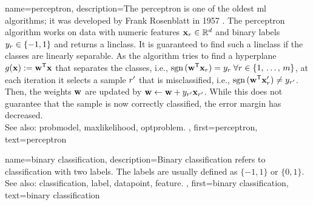 {name={perceptron}, 
	description={The perceptron is one of the oldest \gls{ml} \glspl{algorithm}; 
		it was developed by Frank Rosenblatt in 1957 \cite{rosenblatt1958perceptron}. 
		The perceptron \gls{algorithm} works on \gls{data} with numeric \glspl{feature} 
		${\bf x}_r \in \mathbb{R}^{d}$ 
		and binary \glspl{label} $y_r \in \{-1, 1\}$ and returns a \gls{linclass}. %
		It is guaranteed to find such a \gls{linclass} if the classes are linearly separable. %
		As the \gls{algorithm} tries to find a \gls{hyperplane} $g({\bf x}) := {\bf w}^\mathsf{T} {\bf x}$ 
		that separates the classes, i.e., 
		$\text{sgn}\,({\bf w}^\mathsf{T} {\bf x}_r) = y_r \; \forall r \in \{1, \,\ldots,\, m \}$, 
		at each \gls{iteration} it selects a \gls{sample} $r'$ that is misclassified, i.e., 
		$\text{sgn}\,({\bf w}^\mathsf{T} {\bf x}_{r}') \neq y_{r'}$. 
		Then, the \glspl{weight} ${\bf w}$ are updated by 
		${\bf w} \leftarrow {\bf w} + y_{r'} {\bf x}_{r'}$. 
		While this does not guarantee that the \gls{sample} is now correctly classified, the error margin has decreased. 
		\\
		See also: \gls{probmodel}, \gls{maxlikelihood}, \gls{optproblem}. },
	first={perceptron},
	text={perceptron}
}

{name={binary classification}, 
	description={Binary \gls{classification} refers to \gls{classification} with two \glspl{label}. 
		The \glspl{label} are usually defined as $\{-1, 1\}$ or $\{0, 1\}$. 
		\\ 
		See also: \gls{classification}, \gls{label}, \gls{datapoint}, \gls{feature}. },
	first={binary classification},
	text={binary classification}
}

